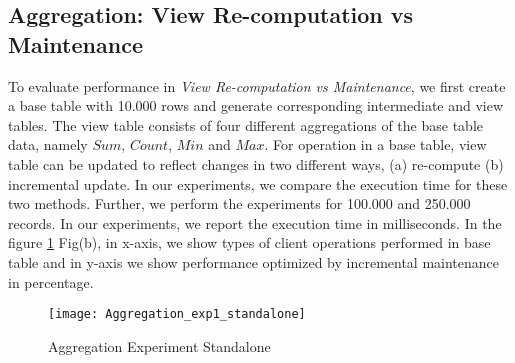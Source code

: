 \documentclass[11pt,a4paper,bibtotoc,idxtotoc,headsepline,footsepline,footexclude,BCOR12mm,DIV13]{scrbook}
\begin{document}
\subsection{Aggregation: View Re-computation vs Maintenance}
\label{Aggr:View recompute vs maintenance}

To evaluate performance in \emph{View Re-computation vs Maintenance}, we first create a base table with 10.000 rows and generate corresponding intermediate and view tables. The view table consists of four different aggregations of the base table data, namely $Sum$, $Count$, $Min$ and $Max$. For operation in a base table, view table can be updated to reflect changes in two different ways, (a) re-compute (b) incremental update. In our experiments, we compare the execution time for these two methods. Further, we perform the experiments for 100.000 and 250.000 records. In our experiments, we report the execution time in milliseconds. In the figure \ref{sec:AggrExpStandalone} Fig(b), in x-axis, we show types of client operations performed in base table and in y-axis we show performance optimized by incremental maintenance in percentage. 

\begin{figure}
	\centering
	\texttt{[image: Aggregation\_exp1\_standalone]}
	\caption{Aggregation Experiment Standalone}
	\label{sec:AggrExpStandalone}
\end{figure} 
\newpage
\end{document}
